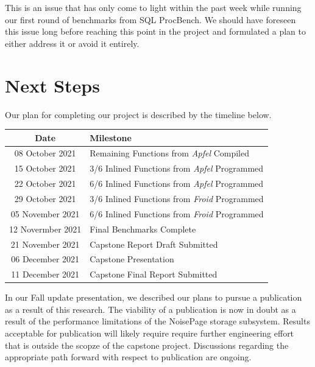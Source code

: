 \documentclass{vldb}
\begin{document}
This is an issue that has only come to light within the past week while running our first round of benchmarks from SQL ProcBench. We should have foreseen this issue long before reaching this point in the project and formulated a plan to either address it or avoid it entirely. 


\section{Next Steps}

Our plan for completing our project is described by the timeline below.

\begin{center}
    \begin{tabular}{ |c|l| } 
        \hline
        \textbf{Date} & \textbf{Milestone} \\ 
        \hline
        08 October 2021 & Remaining Functions from \textit{Apfel} Compiled \\
        \hline
        15 October 2021 & 3/6 Inlined Functions from \textit{Apfel} Programmed \\
        \hline
        22 October 2021 & 6/6 Inlined Functions from \textit{Apfel} Programmed  \\
        \hline
        29 October 2021 & 3/6 Inlined Functions from \textit{Froid} Programmed \\
        \hline
        05 November 2021 & 6/6 Inlined Functions from \textit{Froid} Programmed \\
        \hline
        12 Novermber 2021 & Final Benchmarks Complete \\
        \hline
        21 November 2021 & Capstone Report Draft Submitted \\
        \hline
        06 December 2021 & Capstone Presentation \\
        \hline
        11 December 2021 & Capstone Final Report Submitted \\
        \hline
    \end{tabular}
\end{center}

In our Fall update presentation, we described our plans to pursue a publication as a result of this research. The viability of a publication is now in doubt as a result of the performance limitations of the NoisePage storage subsystem. Results acceptable for publication will likely require require further engineering effort that is outside the scopze of the capstone project. Discussions regarding the appropriate path forward with respect to publication are ongoing.


\newcommand{\newblock}{}

\clearpage


\end{document}
